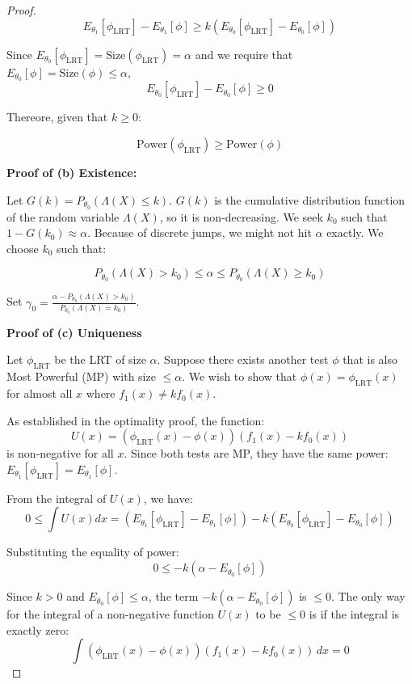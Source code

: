 \documentclass[
  letterpaper,
  DIV=11,
  numbers=noendperiod]{scrreprt}
\renewcommand{\[}{\begin{equation}}
\renewcommand{\]}{\end{equation}}
\theoremstyle{definition}
\theoremstyle{plain}
\theoremstyle{plain}
\theoremstyle{plain}
\theoremstyle{definition}
\theoremstyle{plain}
\theoremstyle{remark}
\begin{document}
\begin{proof}
\[
E_{\theta_1}[\phi_{\text{LRT}}] - E_{\theta_1}[\phi] \ge k (E_{\theta_0}[\phi_{\text{LRT}}] - E_{\theta_0}[\phi])  
\]

Since
\(E_{\theta_0}[\phi_{\text{LRT}}] =\text{Size}(\phi_{\text{LRT}})= \alpha\)
and we require that
\(E_{\theta_0}[\phi] = \text{Size}(\phi)\le \alpha\),\\
\[
E_{\theta_0}[\phi_{\text{LRT}}] - E_{\theta_0}[\phi] \ge 0
\]

Thereore, given that \(k \ge 0\):

\[
\text{Power}(\phi_{\text{LRT}}) \ge \text{Power}(\phi)
\]

\textbf{Proof of (b) Existence:}

Let \(G(k) = P_{\theta_0}(\Lambda(X) \le k)\). \(G(k)\) is the
cumulative distribution function of the random variable \(\Lambda(X)\),
so it is non-decreasing. We seek \(k_0\) such that
\(1 - G(k_0) \approx \alpha\). Because of discrete jumps, we might not
hit \(\alpha\) exactly. We choose \(k_0\) such that:

\[
P_{\theta_0}(\Lambda(X) > k_0) \le \alpha \le P_{\theta_0}(\Lambda(X) \ge k_0)
\]

Set
\(\gamma_0 = \frac{\alpha - P_{\theta_0}(\Lambda(X) > k_0)}{P_{\theta_0}(\Lambda(X) = k_0)}\).

\textbf{Proof of (c) Uniqueness}

Let \(\phi_{\text{LRT}}\) be the LRT of size \(\alpha\). Suppose there
exists another test \(\phi\) that is also Most Powerful (MP) with size
\(\le \alpha\). We wish to show that \(\phi(x) = \phi_{\text{LRT}}(x)\)
for almost all \(x\) where \(f_1(x) \ne k f_0(x)\).

As established in the optimality proof, the function: \[
U(x) = (\phi_{\text{LRT}}(x) - \phi(x))(f_1(x) - k f_0(x))
\] is non-negative for all \(x\). Since both tests are MP, they have the
same power: \(E_{\theta_1}[\phi_{\text{LRT}}] = E_{\theta_1}[\phi]\).

From the integral of \(U(x)\), we have: \[
0 \le \int U(x) dx = (E_{\theta_1}[\phi_{\text{LRT}}] - E_{\theta_1}[\phi]) - k(E_{\theta_0}[\phi_{\text{LRT}}] - E_{\theta_0}[\phi])
\]

Substituting the equality of power: \[
0 \le -k(\alpha - E_{\theta_0}[\phi])
\]

Since \(k > 0\) and \(E_{\theta_0}[\phi] \le \alpha\), the term
\(-k(\alpha - E_{\theta_0}[\phi])\) is \(\le 0\). The only way for the
integral of a non-negative function \(U(x)\) to be \(\le 0\) is if the
integral is exactly zero: \[
\int (\phi_{\text{LRT}}(x) - \phi(x))(f_1(x) - k f_0(x)) \, dx = 0
\]


\end{proof}
\end{document}
